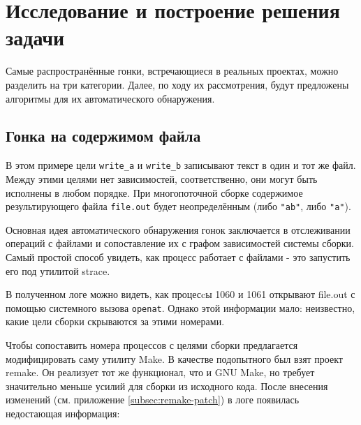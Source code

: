 \section{Исследование и построение решения задачи}
\label{sec:Chapter3} 


Самые распространённые гонки, встречающиеся в реальных проектах, можно разделить на три категории. Далее, по ходу их рассмотрения, будут предложены алгоритмы для их автоматического обнаружения.

\subsection{Гонка на содержимом файла}



В этом примере цели \texttt{write\_a} и \texttt{write\_b} записывают текст в один и тот же файл. Между этими целями нет зависимостей, соответственно, они могут быть исполнены в любом порядке. При многопоточной сборке содержимое результирующего файла \texttt{file.out} будет неопределённым (либо \texttt{"ab"}, либо \texttt{"a"}).

Основная идея автоматического обнаружения гонок заключается в отслеживании операций с файлами и сопоставление их с графом зависимостей системы сборки. Самый простой способ увидеть, как процесс работает с файлами - это запустить его под утилитой strace.



В полученном логе можно видеть, как процесcы 1060 и 1061 открывают file.out с помощью системного вызова \texttt{openat}. Однако этой информации мало: неизвестно, какие цели сборки скрываются за этими номерами.

Чтобы сопоставить номера процессов с целями сборки предлагается модифицировать саму утилиту Make. В качестве подопытного был взят проект remake. Он реализует тот же функционал, что и GNU Make, но требует значительно меньше усилий для сборки из исходного кода. После внесения изменений (см. приложение \ref{subsec:remake-patch}) в логе появилась недостающая информация:

